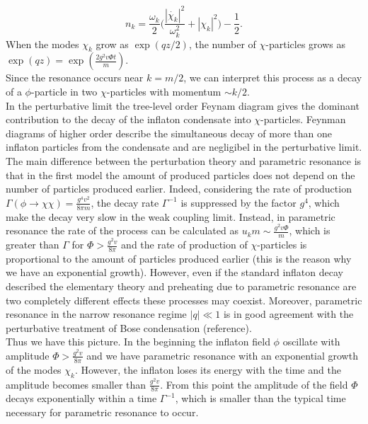\documentclass[11pt,a4paper,twoside]{book}
\begin{document}
\begin{equation}
n_{k}=\frac{\omega_{k}}{2}\Bigg(\frac{|\dot{\chi_{k}}|^{2}}{\omega_{k}^{2}} + |\chi_{k}|^{2}\Bigg) - \frac{1}{2}.
\end{equation}
When the modes $ \chi_{k} $ grow as  $\exp(qz/2) $, the number of $ \chi $-particles grows as $ \exp(qz)= \exp(\frac{2g^{2}v\Phi t}{m}) $.\\
Since the resonance occurs near $ k=m/2 $, we can interpret this process as a decay of a $ \phi $-particle in two $ \chi $-particles with momentum $\sim k/2$.\\
In the perturbative limit the tree-level order Feynam diagram gives the dominant contribution to the decay of the inflaton condensate into $ \chi $-particles. Feynman diagrams of higher order describe the simultaneous decay of more than one inflaton particles from the condensate and are negligibel in the perturbative limit.
The main difference between the perturbation theory and parametric resonance is that in the first model the amount of produced particles does not depend on the number of particles produced earlier. Indeed, considering the rate of production $ \Gamma(\phi \rightarrow \chi \chi) = \frac{g^{4}v^{2}}{8\pi m} $, the decay rate $ \Gamma^{-1} $ is suppressed by the factor $ g^{4} $, which make the decay very slow in the weak coupling limit. Instead, in parametric resonance the rate of the process can be calculated as $ u_{k}m \sim \frac{g^{2} v \Phi}{m} $, which is greater than $\Gamma$ for $ \Phi > \frac{g^{2}v}{8\pi} $ and the rate of production of $ \chi $-particles is proportional to the amount of particles produced earlier (this is the reason why we have an exponential growth). However, even if the standard inflaton decay described the elementary theory and  preheating due to parametric resonance are two completely different effects these processes may coexist. Moreover, parametric resonance in the narrow resonance regime  $ |q| \ll 1 $ is in good agreement with the perturbative treatment of Bose condensation (reference).\\
Thus we have this picture. In the beginning the inflaton field $\phi$ oscillate with amplitude $ \Phi > \frac{g^{2} v}{8\pi} $ and we have parametric resonance with an exponential growth of the modes $\chi_{k}$. However, the inflaton loses its energy with the time and the amplitude becomes smaller than $ \frac{g^{2}v}{8\pi} $. From this point the amplitude of the field $ \Phi $ decays exponentially within a time $ \Gamma^{-1} $, which is smaller than the typical time necessary for parametric resonance to occur. \\
\end{document}
